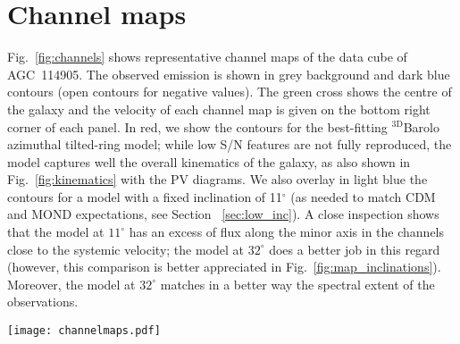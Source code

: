 \documentclass[fleqn,usenatbib]{mnras}
\begin{document}








\appendix
\section{Channel maps}
\label{sec:channelmaps}

Fig.~\ref{fig:channels} shows representative channel maps of the data cube of AGC~114905. The observed emission is shown in grey background and dark blue contours (open contours for negative values). The green cross shows the centre of the galaxy and the velocity of each channel map is given on the bottom right corner of each panel. In red, we show the contours for the best-fitting $\mathrm{^{3D}}$Barolo azimuthal tilted-ring model; while low S/N features are not fully reproduced, the model captures well the overall kinematics of the galaxy, as also shown in Fig.~\ref{fig:kinematics} with the PV diagrams. We also overlay in light blue the contours for a model with a fixed inclination of 11$^\circ$ (as needed to match CDM and MOND expectations, see Section~ \ref{sec:low_inc}). A close inspection shows that the model at $11^\circ$ has an excess of flux along the minor axis in the channels close to the systemic velocity; the model at $32^\circ$ does a better job in this regard (however, this comparison is better appreciated in Fig.~\ref{fig:map_inclinations}). Moreover, the model at $32^\circ$ matches in a better way the spectral extent of the observations.



\begin{figure*}
    \centering
    \texttt{[image: channelmaps.pdf]}
    \caption{Representative channel maps of AGC~114905. The emission of the galaxy is shown in grey background and dark blue contours (open contours for negative values). The green crosses show the centre of the galaxy, and we indicate the velocity corresponding to each channel map on the bottom right corner. The contours for the best-fitting $\mathrm{^{3D}}$Barolo azimuthal tilted-ring model are shown in red, while the contours for a model at $11^\circ$ are shown in light blue. Contours are at -2, 2, 4 times the rms noise per channel.}
    \label{fig:channels}
\end{figure*}
\end{document}
